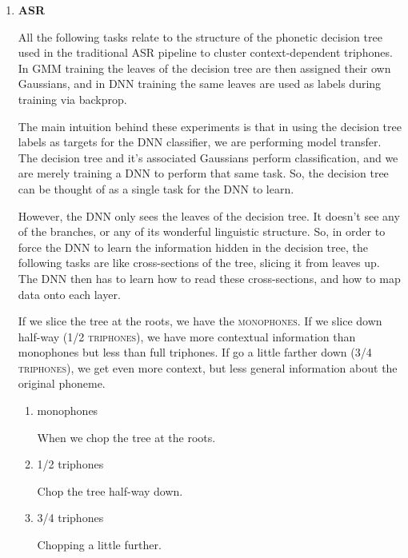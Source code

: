 \documentclass[10pt,a4paper]{article}
\begin{document}
\begin{enumerate}
\newpage

\item \textbf{ASR}

  All the following tasks relate to the structure of the phonetic decision tree used in the traditional ASR pipeline to cluster context-dependent triphones. In GMM training the leaves of the decision tree are then assigned their own Gaussians, and in DNN training the same leaves are used as labels during training via backprop.

  The main intuition behind these experiments is that in using the decision tree labels as targets for the DNN classifier, we are performing model transfer. The decision tree and it's associated Gaussians perform classification, and we are merely training a DNN to perform that same task. So, the decision tree can be thought of as a single task for the DNN to learn.

  However, the DNN only sees the leaves of the decision tree. It doesn't see any of the branches, or any of its wonderful linguistic structure. So, in order to force the DNN to learn the information hidden in the decision tree, the following tasks are like cross-sections of the tree, slicing it from leaves up. The DNN then has to learn how to read these cross-sections, and how to map data onto each layer.

  If we slice the tree at the roots, we have the \textsc{monophones}. If we slice down half-way (\textsc{1/2 triphones}), we have more contextual information than monophones but less than full triphones. If go a little farther down (\textsc{3/4 triphones}), we get even more context, but less general information about the original phoneme.
  
  \begin{enumerate}
  \item monophones

    When we chop the tree at the roots.
    
  \item 1/2 triphones

    Chop the tree half-way down.
    
  \item 3/4 triphones

    Chopping a little further.
    
  \end{enumerate}


  


\end{enumerate}
\end{document}

